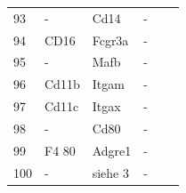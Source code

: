 \begin{table}[ht]
{\begin{tabular}{llllll}
        93 &  - & Cd14 & - \\
        94 &  CD16 & Fcgr3a & - \\
        95 &  - & Mafb & - \\
        96 &  Cd11b & Itgam & - \\
        97 &  Cd11c & Itgax & - \\
        98 &  - & Cd80 & - \\
        99 &  F4 80 & Adgre1 & - \\
        100 & - & siehe 3 & - \\
        \bottomrule
    \end{tabular}
    }
\end{table}